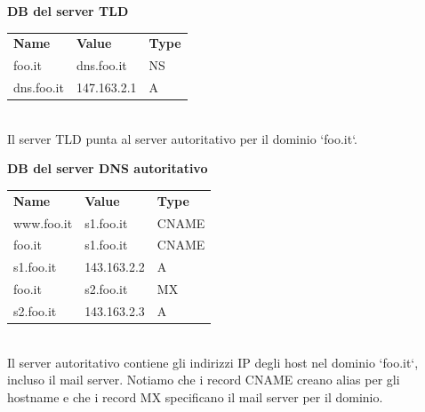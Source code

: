 \bigskip
\textbf{DB del server TLD} \newline
\begin{tabular}{lll}
\textbf{Name} & \textbf{Value}     & \textbf{Type} \\
foo.it        & dns.foo.it         & NS            \\
dns.foo.it    & 147.163.2.1        & A             
\end{tabular} \\ 
Il server TLD punta al server autoritativo per il dominio `foo.it`.

\bigskip
\textbf{DB del server DNS autoritativo} \newline
\begin{tabular}{lll}
\textbf{Name} & \textbf{Value}     & \textbf{Type}  \\
www.foo.it    & s1.foo.it          & CNAME          \\
foo.it        & s1.foo.it          & CNAME          \\
s1.foo.it     & 143.163.2.2        & A              \\
foo.it        & s2.foo.it          & MX             \\
s2.foo.it     & 143.163.2.3        & A              
\end{tabular} \\ 
Il server autoritativo contiene gli indirizzi IP degli host nel dominio `foo.it`, incluso il mail server. Notiamo che i record CNAME creano alias per gli hostname e che i record MX specificano il mail server per il dominio.
